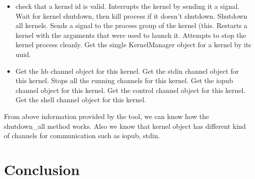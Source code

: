 \begin{itemize}
    \item check that a kernel id is valid. Interrupts the kernel by sending it a signal. Wait for kernel shutdown, then kill process if it doesn't shutdown. Shutdown all kernels. Sends a signal to the process group of the kernel (this. Restarts a kernel with the arguments that were used to launch it. Attempts to stop the kernel process cleanly. Get the single KernelManager object for a kernel by its uuid.
    \item Get the hb channel object for this kernel. Get the stdin channel object for this kernel. Stops all the running channels for this kernel. Get the iopub channel object for this kernel. Get the control channel object for this kernel. Get the shell channel object for this kernel.
    
\end{itemize}

From above information provided by the tool, we can know how the shutdown\_all method works. Also we know that kernel object has different kind of channels for communication such as iopub, stdin.  

\section{Conclusion}
